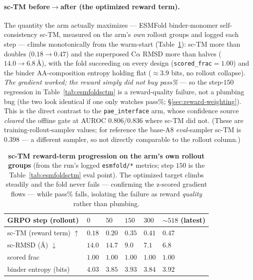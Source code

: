 \documentclass[11pt]{article}
\newcommand{\ttk}[1]{\texttt{\small #1}}
\begin{document}
\paragraph{sc-TM before$\to$after (the optimized reward term).} The quantity the arm actually maximizes
--- ESMFold binder-monomer self-consistency sc-TM, measured on the arm's \emph{own} rollout groups and
logged each step --- climbs monotonically from the warm-start (Table~\ref{tab:esmfoldsctmprog}): sc-TM
more than doubles ($0.18\!\to\!0.47$) and the superposed C$\alpha$ RMSD more than halves
($14.0\!\to\!6.8$\,\AA), with the fold succeeding on every design (\ttk{scored\_frac}$=1.00$) and the
binder AA-composition entropy holding flat ($\approx\!3.9$ bits, no rollout collapse). \emph{The gradient
worked; the reward simply did not buy pass\%} --- so the step-$150$ regression in
Table~\ref{tab:esmfoldsctm} is a reward-quality failure, not a plumbing bug (the two look identical if
one only watches pass\%; \S\ref{sec:reward-weighting}). This is the direct contrast to the
\ttk{pae\_interface} arm, whose confidence source \emph{cleared} the offline gate at AUROC
$0.806$/$0.836$ where sc-TM did not. (These are training-rollout-sampler values; for reference the
base-A8 \emph{eval}-sampler sc-TM is $0.398$ --- a different sampler, so not directly comparable to the
rollout column.)

\begin{table}[htbp]
\centering
{\renewcommand{\arraystretch}{1.2}%
\begin{tabular}{@{}>{\raggedright\arraybackslash}p{5.2cm}
                    >{\centering\arraybackslash}p{1.6cm}
                    >{\centering\arraybackslash}p{1.6cm}
                    >{\centering\arraybackslash}p{1.6cm}
                    >{\centering\arraybackslash}p{1.6cm}
                    >{\centering\arraybackslash}p{2.0cm}@{}}
\toprule
\textbf{GRPO step (rollout)} & $0$ & $50$ & $150$ & $300$ & $\sim\!518$ (latest)\\
\midrule
sc-TM (reward term) $\uparrow$          & $0.18$ & $0.20$ & $0.35$ & $0.41$ & $\mathbf{0.47}$\\
sc-RMSD (\AA) $\downarrow$              & $14.0$ & $14.7$ & $9.0$  & $7.1$  & $\mathbf{6.8}$\\
scored frac                            & $1.00$ & $1.00$ & $1.00$ & $1.00$ & $1.00$\\
binder entropy (bits)                  & $4.03$ & $3.85$ & $3.93$ & $3.84$ & $3.92$\\
\bottomrule
\end{tabular}}
\caption{\textbf{sc-TM reward-term progression on the arm's own rollout groups} (from the run's logged
\ttk{esmfold/*} metrics; step $150$ is the Table~\ref{tab:esmfoldsctm} eval point). The optimized target
climbs steadily and the fold never fails --- confirming the z-scored gradient flows --- while pass\%
falls, isolating the failure as reward \emph{quality} rather than plumbing.}
\label{tab:esmfoldsctmprog}
\end{table}
\end{document}

